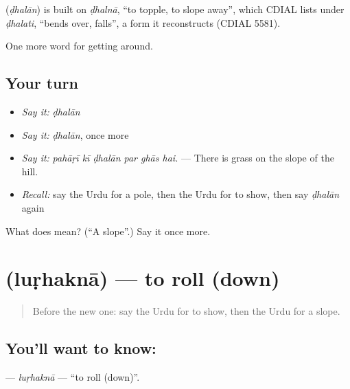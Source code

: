 \begin{cousinweb}
\textbf{} (\emph{ḍhalān}) is built on \emph{ḍhalnā}, \textquotedblleft{}to topple, to slope away\textquotedblright{}, which CDIAL lists under \emph{ḍhalati}, \textquotedblleft{}bends over, falls\textquotedblright{}, a form it reconstructs (CDIAL 5581).
\end{cousinweb}

\begin{grammarlens}[title={What you've built}]
One more word for getting around.
\end{grammarlens}

\subsection*{Your turn}
\begin{itemize}
\raggedright
  \item \emph{Say it:} \emph{ḍhalān}
  \item \emph{Say it:} \emph{ḍhalān}, once more
  \item \emph{Say it:} \emph{pahāṛī kī ḍhalān par ghās hai.} — There is grass on the slope of the hill.
  \item \emph{Recall:} say the Urdu for a pole, then the Urdu for to show, then say \emph{ḍhalān} again
\end{itemize}

\begin{tcolorbox}[breakable,colback=teal!4,colframe=teal!35!black,title={Before you move on}]
What does  mean? (\textquotedblleft{}A slope\textquotedblright{}.) Say it once more.
\end{tcolorbox}
\section[\texorpdfstring{\ur{لڑھکنا} (luṛhaknā)}{لڑھکنا (luṛhaknā)}]{ (luṛhaknā) — to roll (down)}

\label{lesson:UR-C411-lurhakna}



\begin{quote}
Before the new one: say the Urdu for to show, then the Urdu for a slope.
\end{quote}

\subsection*{You'll want to know: }
\textbf{} — \emph{luṛhaknā} — \textquotedblleft{}to roll (down)\textquotedblright{}.

